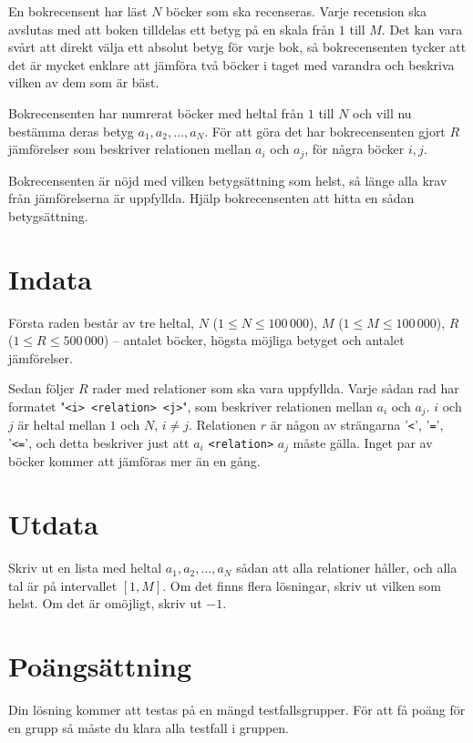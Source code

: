En bokrecensent har läst $N$ böcker som ska recenseras. Varje recension ska
avslutas med att boken tilldelas ett betyg på en skala från $1$ till $M$. Det kan
vara svårt att direkt välja ett absolut betyg för varje bok, så
bokrecensenten tycker att det är mycket enklare att jämföra två böcker i
taget med varandra och beskriva vilken av dem som är bäst.

Bokrecensenten har numrerat böcker med heltal från $1$ till $N$ och vill nu
bestämma deras betyg $a_1, a_2, \dots , a_N$. För att göra det har
bokrecensenten gjort $R$ jämförelser som beskriver relationen mellan $a_i$ och
$a_j$, för några böcker $i, j$.

Bokrecensenten är nöjd med vilken betygsättning som helst, så länge alla krav
från jämförelserna är uppfyllda. Hjälp bokrecensenten att hitta en sådan
betygsättning.

\section*{Indata}

Första raden består av tre heltal, $N$ ($1 \leq N \leq 100\,000$), 
$M$ ($1 \leq M \leq 100\,000$),
$R$ ($1 \leq R \leq 500\,000$) -- antalet böcker, högsta möjliga
betyget och antalet jämförelser.

Sedan följer $R$ rader med relationer som ska
vara uppfyllda. Varje sådan rad har formatet "\texttt{<i> <relation> <j>}",
som beskriver relationen mellan $a_i$ och $a_j$. $i$ och $j$ är heltal mellan
$1$ och $N$, $i \neq j$. Relationen $r$ är någon av strängarna '\texttt{<}', '\texttt{=}',
'\texttt{<=}', och detta beskriver just att $a_i$ \texttt{<relation>} $a_j$ måste gälla.
Inget par av böcker kommer att jämföras mer än en gång.

\section*{Utdata}

Skriv ut en lista med heltal $a_1, a_2, \ldots , a_N$ sådan att alla relationer håller, och
alla tal är på intervallet $[1, M]$. Om det finns flera lösningar, skriv ut vilken som helst.
Om det är omöjligt, skriv ut $-1$.

\section*{Poängsättning}
Din lösning kommer att testas på en mängd testfallsgrupper.
För att få poäng för en grupp så måste du klara alla testfall i gruppen.

